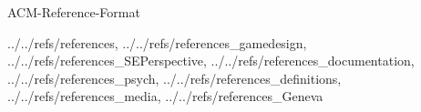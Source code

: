 \documentclass[11pt, titlepage]{article}
\begin{document}
    \clearpage

    \tableofcontents

    \clearpage

    \listoftables

    \listoffigures

    \clearpage

    

    \clearpage

    

    \clearpage

    

    \clearpage

    

    \clearpage

    

    \clearpage

    

    \clearpage

    

    \clearpage

     {ACM-Reference-Format}
    
    {../../refs/references, ../../refs/references_gamedesign,
    ../../refs/references_SEPerspective, ../../refs/references_documentation,
    ../../refs/references_psych, ../../refs/references_definitions,
    ../../refs/references_media, ../../refs/references_Geneva}

    \clearpage

    \begin{appendix}

        

        \clearpage

        

    \end{appendix}
\end{document}

